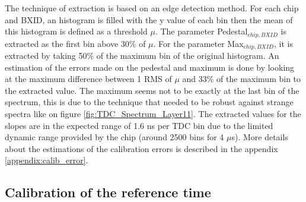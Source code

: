 \documentclass[twoside,a4paper,11pt]{article}
\begin{document}
The technique of extraction is based on an edge detection method. For each chip and BXID, an histogram is filled with the y value of each bin then the mean of this histogram is defined as a threshold $\mu$. The parameter Pedestal$_{chip, BXID}$ is extracted as the first bin above 30\% of $\mu$. For the parameter Max$_{chip, BXID}$, it is extracted by taking 50\% of the maximum bin of the original histogram. An estimation of the errors made on the pedestal and maximum is done by looking at the maximum difference between 1 RMS of $\mu$ and 33\% of the maximum bin to the extracted value. The maximum seems not to be exactly at the last bin of the spectrum, this is due to the technique that needed to be robust against strange spectra like on figure \ref{fig:TDC_Spectrum_Layer11}.
The extracted values for the slopes are in the expected range of 1.6 ns per TDC bin due to the limited dynamic range provided by the chip (around 2500 bins for 4 $\mu$s). More details about the estimations of the calibration errors is described in the appendix \ref{appendix:calib_error}.

\subsection{Calibration of the reference time}
\end{document}
